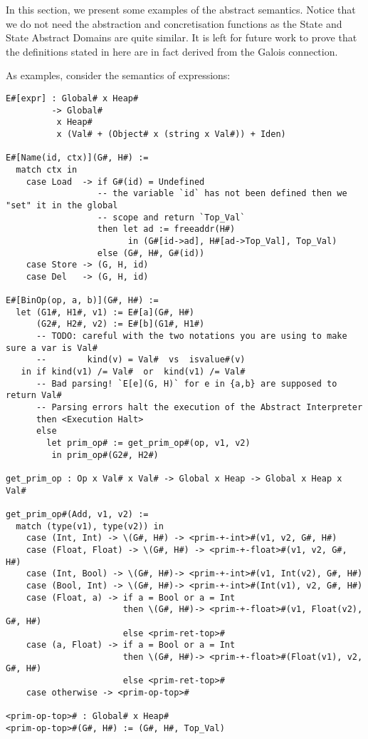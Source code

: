 In this section, we present some examples of the abstract semantics.
Notice that we do not need the abstraction and concretisation
functions as the State and State Abstract Domains are quite similar. It
is left for future work to prove that the definitions stated in here are
in fact derived from the Galois connection.

As examples, consider the semantics of expressions:

\begin{verbatim}
E#[expr] : Global# x Heap#
         -> Global#
          x Heap#
          x (Val# + (Object# x (string x Val#)) + Iden)

E#[Name(id, ctx)](G#, H#) :=
  match ctx in
    case Load  -> if G#(id) = Undefined
                  -- the variable `id` has not been defined then we "set" it in the global
                  -- scope and return `Top_Val`
                  then let ad := freeaddr(H#)
                        in (G#[id->ad], H#[ad->Top_Val], Top_Val)
                  else (G#, H#, G#(id))
    case Store -> (G, H, id)
    case Del   -> (G, H, id)

E#[BinOp(op, a, b)](G#, H#) :=
  let (G1#, H1#, v1) := E#[a](G#, H#)
      (G2#, H2#, v2) := E#[b](G1#, H1#)
      -- TODO: careful with the two notations you are using to make sure a var is Val#
      --        kind(v) = Val#  vs  isvalue#(v)
   in if kind(v1) /= Val#  or  kind(v1) /= Val#
      -- Bad parsing! `E[e](G, H)` for e in {a,b} are supposed to return Val#
      -- Parsing errors halt the execution of the Abstract Interpreter
      then <Execution Halt>
      else
        let prim_op# := get_prim_op#(op, v1, v2)
         in prim_op#(G2#, H2#)

get_prim_op : Op x Val# x Val# -> Global x Heap -> Global x Heap x Val#

get_prim_op#(Add, v1, v2) :=
  match (type(v1), type(v2)) in
    case (Int, Int) -> \(G#, H#) -> <prim-+-int>#(v1, v2, G#, H#)
    case (Float, Float) -> \(G#, H#) -> <prim-+-float>#(v1, v2, G#, H#)
    case (Int, Bool) -> \(G#, H#)-> <prim-+-int>#(v1, Int(v2), G#, H#)
    case (Bool, Int) -> \(G#, H#)-> <prim-+-int>#(Int(v1), v2, G#, H#)
    case (Float, a) -> if a = Bool or a = Int
                       then \(G#, H#)-> <prim-+-float>#(v1, Float(v2), G#, H#)
                       else <prim-ret-top>#
    case (a, Float) -> if a = Bool or a = Int
                       then \(G#, H#)-> <prim-+-float>#(Float(v1), v2, G#, H#)
                       else <prim-ret-top>#
    case otherwise -> <prim-op-top>#

<prim-op-top># : Global# x Heap#
<prim-op-top>#(G#, H#) := (G#, H#, Top_Val)
\end{verbatim}

